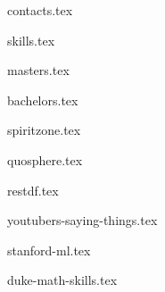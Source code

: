 \documentclass[11pt]{article}
\begin{document}
{contacts.tex}



{skills.tex}



{masters.tex}


{bachelors.tex}



{spiritzone.tex}

{quosphere.tex}





{restdf.tex}

{youtubers-saying-things.tex}



{stanford-ml.tex}

{duke-math-skills.tex}
\end{document}
